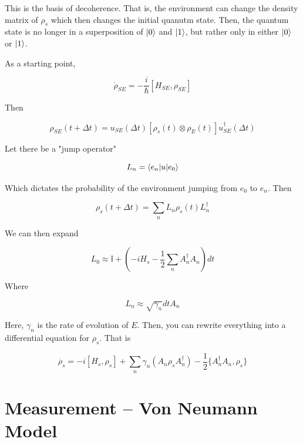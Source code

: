 \documentclass{article}
\newtheorem{one minute paper}[theorem]{One Minute Paper}
\begin{document}
This is the basis of decoherence. That is, the environment can change the density matrix of $\rho_s$ which then changes the initial quanutm state. Then, the 
quantum state is no longer in a superposition of $\ket{0}$ and $\ket{1}$, but rather only in either $\ket{0}$ or $\ket{1}$.  

As a starting point, 

\begin{equation}
    \dot{\rho}_{SE} = -\frac{i}{\hbar}\left[ H_{SE}, \rho_{SE} \right]
\end{equation}

Then 

\begin{equation}
    \rho_{SE}(t + \Delta t) = u_{SE}(\Delta t)\left[ \rho_{s}(t) \otimes \rho_E(t) \right]u^{\dagger}_{SE}(\Delta t)
\end{equation}

Let there be a "jump operator" 

\begin{equation}
    L_n = \braket{e_n | u | e_0}
\end{equation}

Which dictates the probability of the environment jumping from $e_0$ to $e_n$. Then 

\begin{equation}
    \rho_s(t + \Delta t) = \sum_n L_n \rho_s(t)L_{n}^{\dagger}
\end{equation}

We can then expand 

\begin{equation}
    L_0 \approx \mathbb{I} + \left( -iH_s - \frac{1}{2} \sum_n A_n^{\dagger}A_n\right)dt
\end{equation}

Where 

\begin{equation}
    L_n \approx \sqrt{\gamma_n}dt A_n
\end{equation}

Here, $\gamma_n$ is the rate of evolution of $E$. Then, you can rewrite everything into a differential equation for $\rho_s$. That is 

\begin{equation}
    \dot{\rho_s} = -i [H_s, \rho_s] + \sum_n \gamma_n (A_n \rho_s A_n^{\dagger}) - \frac{1}{2}\{ A_n^{\dagger}A_n, \rho_s \}
\end{equation}

\section*{Measurement -- Von Neumann Model}
\end{document}
